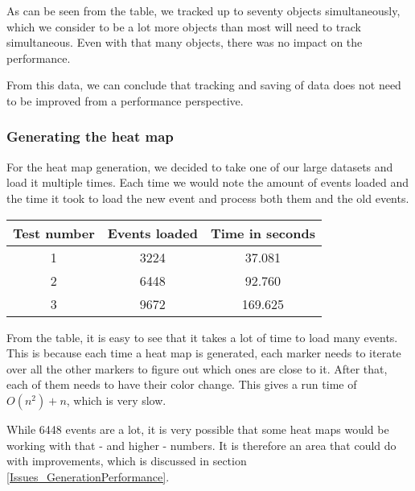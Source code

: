 As can be seen from the table, we tracked up to seventy objects simultaneously, which we consider to be a lot more objects than most will need to track simultaneous. Even with that many objects, there was no impact on the performance.

From this data, we can conclude that tracking and saving of data does not need to be improved from a performance perspective.

\subsubsection{Generating the heat map}
\label{Testing_Performance_Generating}

For the heat map generation, we decided to take one of our large datasets and load it multiple times. Each time we would note the amount of events loaded and the time it took to load the new event and process both them and the old events.

\begin{center}
	\begin{tabular}{| c | c | c |}
		\hline
		Test number & Events loaded & Time in seconds \\ \hline
		1 & 3224 & 37.081 \\ \hline
		2 & 6448 & 92.760 \\ \hline
		3 & 9672 & 169.625 \\
		\hline
	\end{tabular}
\end{center}

From the table, it is easy to see that it takes a lot of time to load many events. This is because each time a heat map is generated, each marker needs to iterate over all the other markers to figure out which ones are close to it. After that, each of them needs to have their color change. This gives a run time of $O(n^2) + n$, which is very slow.

While 6448 events are a lot, it is very possible that some heat maps would be working with that - and higher - numbers. It is therefore an area that could do with improvements, which is discussed in section \ref{Issues_GenerationPerformance}.